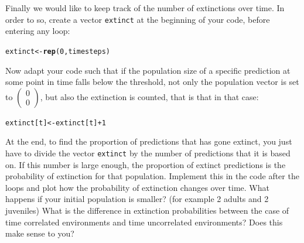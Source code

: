 \documentclass{article}\usepackage[]{graphicx}\usepackage[]{color}
\makeatletter
\newcommand{\hlnum}[1]{\textcolor[rgb]{0.686,0.059,0.569}{#1}}%
\newcommand{\hlopt}[1]{\textcolor[rgb]{0,0,0}{#1}}%
\newcommand{\hlstd}[1]{\textcolor[rgb]{0.345,0.345,0.345}{#1}}%
\newcommand{\hlkwb}[1]{\textcolor[rgb]{0.69,0.353,0.396}{#1}}%
\newcommand{\hlkwd}[1]{\textcolor[rgb]{0.737,0.353,0.396}{\textbf{#1}}}%
\newenvironment{kframe}{%
 \def\at@end@of@kframe{}%
 \ifinner\ifhmode%
  \def\at@end@of@kframe{\end{minipage}}%
  \begin{minipage}{\columnwidth}%
 \fi\fi%
 \def\FrameCommand##1{\hskip\@totalleftmargin \hskip-\fboxsep
 \colorbox{shadecolor}{##1}\hskip-\fboxsep
     \hskip-\linewidth \hskip-\@totalleftmargin \hskip\columnwidth}%
 \MakeFramed {\advance\hsize-\width
   \@totalleftmargin\z@ \linewidth\hsize
   \@setminipage}}%
 {\par\unskip\endMakeFramed%
 \at@end@of@kframe}
\newenvironment{knitrout}{}{} %
\makeatother
\begin{document}
Finally we would like to keep track of the number of extinctions over time. In order to so, create a vector \texttt{extinct} at the beginning of your code, before entering any loop:
\begin{knitrout}
\color{fgcolor}\begin{kframe}
\begin{alltt}
\hlstd{extinct}\hlkwb{<-}\hlkwd{rep}\hlstd{(}\hlnum{0}\hlstd{,timesteps)}
\end{alltt}
\end{kframe}
\end{knitrout}
Now adapt your code such that if the population size of a specific prediction at some point in time falls below the threshold, not only the population vector is set to $\begin{pmatrix} 0 \\ 0 \end{pmatrix}$, but also the extinction is counted, that is that in that case:
\begin{knitrout}
\color{fgcolor}\begin{kframe}
\begin{alltt}
\hlstd{extinct[t]}\hlkwb{<-}\hlstd{extinct[t]}\hlopt{+}\hlnum{1}
\end{alltt}
\end{kframe}
\end{knitrout}
At the end, to find the proportion of predictions that has gone extinct, you just have to divide the vector \texttt{extinct} by the number of predictions that it is based on. If this number is large enough, the proportion of extinct predictions is the probability of extinction for that population. Implement this in the code after the loops and plot how the probability of extinction changes over time. What happens if your initial population is smaller? (for example 2 adults and 2 juveniles) What is the difference in extinction probabilities between the case of time correlated environments and time uncorrelated environments? Does this make sense to you?
\end{document}
